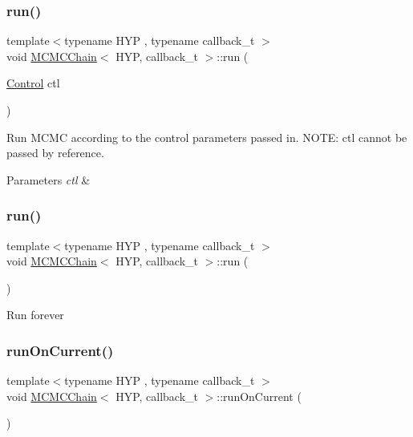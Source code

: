 \subsubsection{\texorpdfstring{run()}{run()}\hspace{0.1cm}{\footnotesize\ttfamily [1/2]}}
{\footnotesize\ttfamily template$<$typename H\+YP , typename callback\+\_\+t $>$ \\
void \hyperlink{class_m_c_m_c_chain}{M\+C\+M\+C\+Chain}$<$ H\+YP, callback\+\_\+t $>$\+::run (\begin{DoxyParamCaption}\item[{\hyperlink{struct_control}{Control}}]{ctl }\end{DoxyParamCaption})\hspace{0.3cm}{\ttfamily [inline]}}



Run M\+C\+MC according to the control parameters passed in. N\+O\+TE\+: ctl cannot be passed by reference. 


\begin{DoxyParams}{Parameters}
{\em ctl} & \\
\hline
\end{DoxyParams}
\mbox{\label{class_m_c_m_c_chain_ae59e07a79da1bf56b01429efcb9fb312}} 
\subsubsection{\texorpdfstring{run()}{run()}\hspace{0.1cm}{\footnotesize\ttfamily [2/2]}}
{\footnotesize\ttfamily template$<$typename H\+YP , typename callback\+\_\+t $>$ \\
void \hyperlink{class_m_c_m_c_chain}{M\+C\+M\+C\+Chain}$<$ H\+YP, callback\+\_\+t $>$\+::run (\begin{DoxyParamCaption}{ }\end{DoxyParamCaption})\hspace{0.3cm}{\ttfamily [inline]}}

Run forever\mbox{\label{class_m_c_m_c_chain_a4214114e0ef4adcd4badfe1440693190}} 
\subsubsection{\texorpdfstring{run\+On\+Current()}{runOnCurrent()}}
{\footnotesize\ttfamily template$<$typename H\+YP , typename callback\+\_\+t $>$ \\
void \hyperlink{class_m_c_m_c_chain}{M\+C\+M\+C\+Chain}$<$ H\+YP, callback\+\_\+t $>$\+::run\+On\+Current (\begin{DoxyParamCaption}{ }\end{DoxyParamCaption})\hspace{0.3cm}{\ttfamily [inline]}}

